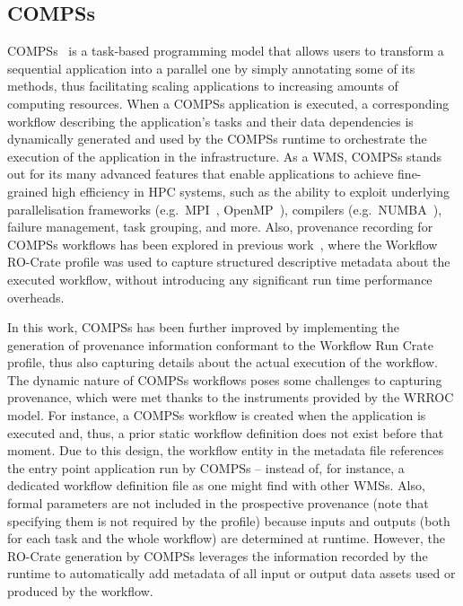 \documentclass[10pt,letterpaper]{article}
\begin{document}
\subsection{COMPSs}\label{compss}

COMPSs~\cite{Lordan 2014} is a task-based programming model that allows users to transform a sequential application into a parallel one by simply annotating some of its methods, thus facilitating scaling applications to increasing amounts of computing resources.
When a COMPSs application is executed, a corresponding workflow describing the application's tasks and their data dependencies is dynamically generated and used by the COMPSs runtime to orchestrate the execution of the application in the infrastructure.
As a WMS, COMPSs stands out for its many advanced features that enable applications to achieve fine-grained high efficiency in HPC systems, such as the ability to exploit underlying parallelisation frameworks (e.g.~MPI~\cite{Gabriel 2004}, OpenMP~\cite{Dagum 1998}), compilers (e.g.~NUMBA~\cite{Lam 2015}), failure management, task grouping, and more.  Also, provenance recording for COMPSs workflows has been explored in previous work~\cite{Sirvent 2022}, where the Workflow RO-Crate profile was used to capture structured descriptive metadata about the executed workflow, without introducing any significant run time performance overheads.

In this work, COMPSs has been further improved by implementing the generation of provenance
information conformant to the Workflow Run Crate profile, thus also capturing
details about the actual execution of the workflow.
%
The dynamic nature of COMPSs workflows poses some challenges to capturing
provenance, which were met thanks to the instruments
provided by the WRROC model.
%
For instance, a COMPSs workflow is created when the application is executed and, thus, a prior static workflow definition does not exist before that moment.
Due to this design, the workflow entity in the metadata file references the entry point application run by COMPSs -- instead of, for instance, a dedicated workflow definition file as one might find with other WMSs. Also, formal parameters are not included in the prospective provenance (note that specifying them is not required by the profile) because inputs and outputs (both for each task and the whole workflow) are determined at runtime.
However, the RO-Crate generation by COMPSs leverages the information recorded by the runtime to automatically add metadata of all input or output data assets used or produced by the workflow.
\end{document}
